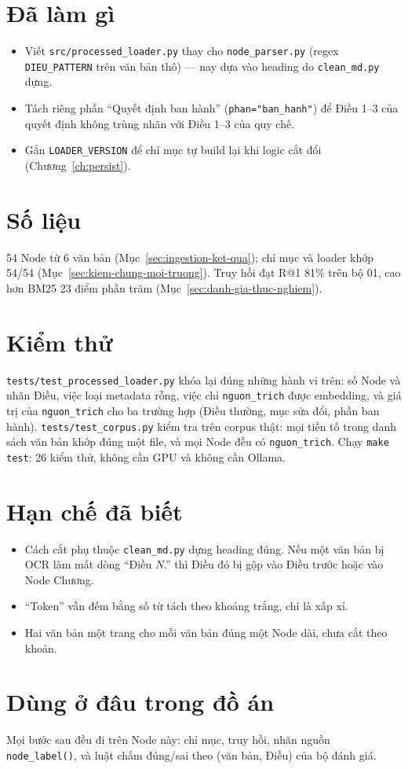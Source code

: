 \section{Đã làm gì}

\begin{itemize}
  \item Viết \texttt{src/processed\_loader.py} thay cho \texttt{node\_parser.py} (regex \texttt{DIEU\_PATTERN} trên
        văn bản thô) --- nay dựa vào heading do \texttt{clean\_md.py} dựng.
  \item Tách riêng phần ``Quyết định ban hành'' (\texttt{phan="ban\_hanh"}) để Điều 1--3 của quyết định không
        trùng nhãn với Điều 1--3 của quy chế.
  \item Gắn \texttt{LOADER\_VERSION} để chỉ mục tự build lại khi logic cắt đổi (Chương~\ref{ch:persist}).
\end{itemize}

\section{Số liệu}

54 Node từ 6 văn bản (Mục~\ref{sec:ingestion-ket-qua}); chỉ mục và loader khớp 54/54
(Mục~\ref{sec:kiem-chung-moi-truong}). Truy hồi đạt R@1 81\% trên bộ 01, cao hơn BM25 23 điểm phần trăm
(Mục~\ref{sec:danh-gia-thuc-nghiem}).


\section{Kiểm thử}

\texttt{tests/test\_processed\_loader.py} khóa lại đúng những hành vi trên: số Node và nhãn Điều,
việc loại metadata rỗng, việc chỉ \texttt{nguon\_trich} được embedding, và giá trị của
\texttt{nguon\_trich} cho ba trường hợp (Điều thường, mục sửa đổi, phần ban hành).
\texttt{tests/test\_corpus.py} kiểm tra trên corpus thật: mọi tiền tố trong danh sách văn bản khớp
đúng một file, và mọi Node đều có \texttt{nguon\_trich}. Chạy \texttt{make test}: 26 kiểm thử, không
cần GPU và không cần Ollama.

\section{Hạn chế đã biết}

\begin{itemize}
  \item Cách cắt phụ thuộc \texttt{clean\_md.py} dựng heading đúng. Nếu một văn bản bị OCR làm mất
        dòng ``Điều $N$.'' thì Điều đó bị gộp vào Điều trước hoặc vào Node Chương.
  \item ``Token'' vẫn đếm bằng số từ tách theo khoảng trắng, chỉ là xấp xỉ.
  \item Hai văn bản một trang cho mỗi văn bản đúng một Node dài, chưa cắt theo khoản.
\end{itemize}

\section{Dùng ở đâu trong đồ án}

Mọi bước sau đều đi trên Node này: chỉ mục, truy hồi, nhãn nguồn \texttt{node\_label()}, và luật chấm
đúng/sai theo (văn bản, Điều) của bộ đánh giá.
